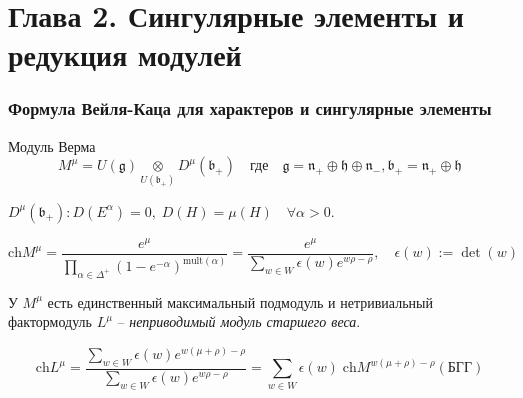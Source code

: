\documentclass[pdftex]{beamer}
\newcommand{\gf}{\mathfrak{g}}
\newcommand{\bff}{\mathfrak{b}}
\newcommand{\hf}{\mathfrak{h}}
\theoremstyle{definition} \newtheorem{Def}{Определение}
\begin{document}
\section{Глава 2. Сингулярные элементы и редукция модулей}

\begin{frame}
  \frametitle{Формула Вейля-Каца для характеров и сингулярные элементы}

Модуль Верма 
\begin{equation*}
 M^{\mu}=U(\gf)\underset{U(\bff_{+})}{\otimes} D^{\mu}(\bff_{+}) \quad \mbox{где} \quad     \gf=\mathfrak{n}_{+}\oplus \hf \oplus\mathfrak{n}_{-}, \bff_{+}=\mathfrak{n}_{+}\oplus \hf
\end{equation*}

$D^{\mu}(\bff_{+}): D(E^{\alpha})=0,\; D(H)=\mu(H)\quad \forall \alpha>0$.

\begin{equation*}
  \label{eq:11}
  \mathrm{ch} M^{\mu}=\frac{e^{\mu}}{\displaystyle{\prod_{\alpha\in \Delta^{+}} \left( 1-e^{-\alpha}\right)^{\mathrm{mult}(\alpha)}}}=\frac{e^{\mu}}{\displaystyle{\sum_{w\in W} \epsilon(w) e^{w\rho-\rho}}}, \quad \epsilon \left( w\right) :=\det \left( w\right)
\end{equation*}
  
У $M^{\mu}$ есть единственный максимальный подмодуль и нетривиальный фактормодуль $L^{\mu}$ -- 
{\it неприводимый модуль старшего веса}. 

\begin{equation*}
  \label{eq:13}
  \mathrm{ch} L^{\mu}=\frac{\sum_{w\in W} \epsilon(w) e^{w(\mu+\rho)-\rho}}{\sum_{w\in W}\epsilon(w) e^{w\rho-\rho}}=\sum_{w\in W} \epsilon(w)\; \mathrm{ch} M^{w(\mu+\rho)-\rho} (\mbox{БГГ})
\end{equation*}

\end{frame}
\end{document}
